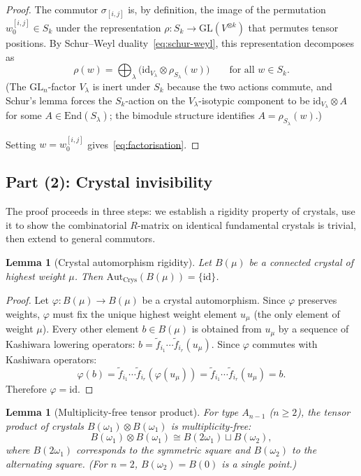 \documentclass[11pt]{article}
\newtheorem{lemma}[theorem]{Lemma}
\theoremstyle{remark}
\newcommand{\Crys}{\mathrm{Crys}}
\newcommand{\GL}{\mathrm{GL}}
\newcommand{\End}{\mathrm{End}}
\newcommand{\Aut}{\mathrm{Aut}}
\newcommand{\id}{\mathrm{id}}
\begin{document}
\begin{proof}
The commutor $\sigma_{[i,j]}$ is, by definition, the image of the
permutation $w_0^{[i,j]} \in S_k$ under the representation
$\rho\colon S_k \to \GL(V^{\otimes k})$ that permutes tensor positions.
By Schur--Weyl duality~\eqref{eq:schur-weyl}, this representation
decomposes as
\[
  \rho(w) = \bigoplus_\lambda \bigl(
    \id_{V_\lambda} \otimes \rho_{S_\lambda}(w)
  \bigr)
  \qquad \text{for all } w \in S_k.
\]
(The $\GL_n$-factor $V_\lambda$ is inert under $S_k$ because the two
actions commute, and Schur's lemma forces the $S_k$-action on the
$V_\lambda$-isotypic component to be $\id_{V_\lambda} \otimes A$ for
some $A \in \End(S_\lambda)$; the bimodule structure identifies
$A = \rho_{S_\lambda}(w)$.)

Setting $w = w_0^{[i,j]}$ gives~\eqref{eq:factorisation}.
\end{proof}

\subsection{Part (2): Crystal invisibility}

The proof proceeds in three steps: we establish a rigidity property
of crystals, use it to show the combinatorial $R$-matrix on identical
fundamental crystals is trivial, then extend to general commutors.

\begin{lemma}[Crystal automorphism rigidity]\label{lem:rigidity}
Let $B(\mu)$ be a connected crystal of highest weight $\mu$.
Then $\Aut_{\Crys}(B(\mu)) = \{\id\}$.
\end{lemma}

\begin{proof}
Let $\varphi\colon B(\mu) \to B(\mu)$ be a crystal automorphism.
Since $\varphi$ preserves weights, $\varphi$ must fix the unique highest
weight element $u_\mu$ (the only element of weight $\mu$). Every other
element $b \in B(\mu)$ is obtained from $u_\mu$ by a sequence of
Kashiwara lowering operators: $b = \tilde{f}_{i_1} \cdots \tilde{f}_{i_r}(u_\mu)$.
Since $\varphi$ commutes with Kashiwara operators:
\[
  \varphi(b) = \tilde{f}_{i_1} \cdots \tilde{f}_{i_r}(\varphi(u_\mu))
  = \tilde{f}_{i_1} \cdots \tilde{f}_{i_r}(u_\mu) = b.
\]
Therefore $\varphi = \id$.
\end{proof}

\begin{lemma}[Multiplicity-free tensor product]\label{lem:mult-free}
For type $A_{n-1}$ ($n \geq 2$), the tensor product of crystals
$B(\omega_1) \otimes B(\omega_1)$ is multiplicity-free:
\[
  B(\omega_1) \otimes B(\omega_1)
  \cong B(2\omega_1) \sqcup B(\omega_2),
\]
where $B(2\omega_1)$ corresponds to the symmetric square and
$B(\omega_2)$ to the alternating square. (For $n = 2$, $B(\omega_2)
= B(0)$ is a single point.)
\end{lemma}
\end{document}
